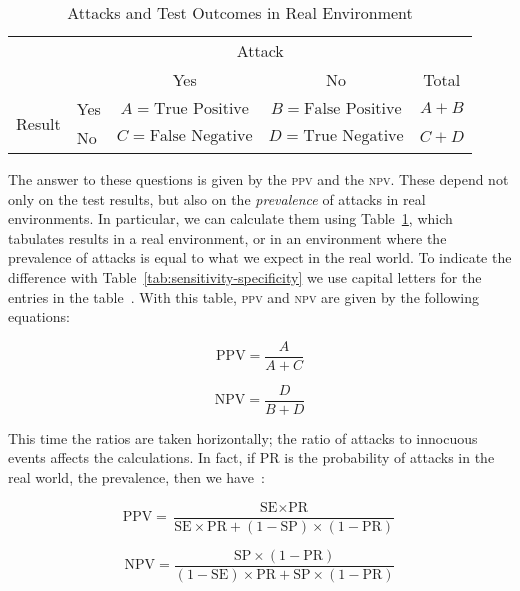 \documentclass[conference]{IEEEtran}
\begin{document}
\begin{table}[ht]

\caption{Attacks and Test Outcomes in Real Environment}
\label{tab:ppv-npv}

\begin{tabular}{l|l|c|c|c}
\multicolumn{2}{c}{} & \multicolumn{2}{c}{Attack} & \\ \cline{3-4}
\multicolumn{2}{c|}{} & Yes & No & Total \\ \cline{2-5}
\multirow{2}{*}{Result} &  Yes &  $A = \textrm{True Positive}$ & 
$B = \textrm{False Positive}$ & \multicolumn{1}{c|}{$A + B$}\\
& No & $C = \textrm{False Negative}$ & $D = \textrm{True Negative}$ &
\multicolumn{1}{c|}{$C + D$}\\ 
\cline{2-5}
\end{tabular}

\end{table}

The answer to these questions is given by the \textsc{ppv} and the
\textsc{npv}. These depend not only on the test results, but also on
the \emph{prevalence} of attacks in real environments. In particular,
we can calculate them using Table~\ref{tab:ppv-npv}, which tabulates
results in a real environment, or in an environment where the
prevalence of attacks is equal to what we expect in the real world. To
indicate the difference with Table~\ref{tab:sensitivity-specificity}
we use capital letters for the entries in the table~\cite{linn2004}.
With this table, \textsc{ppv} and \textsc{npv} are given by the
following equations:

\begin{equation}
\textrm{PPV} = \frac{A}{A + C}
\end{equation}

\begin{equation}
\textrm{NPV} = \frac{D}{B + D}
\end{equation}

This time the ratios are taken horizontally; the ratio of attacks to
innocuous events affects the calculations. In fact, if PR is the
probability of attacks in the real world, the prevalence, then we
have~\cite{linn2004,altman1994}:

\begin{equation}
\textrm{PPV} = \frac{\textrm{SE}\times \textrm{PR}}{
\textrm{SE}\times \textrm{PR} + (1 - \textrm{SP})\times (1 - \textrm{PR})}
\end{equation}

\begin{equation}
\textrm{NPV} = \frac{\textrm{SP}\times (1 - \textrm{PR})}{
(1 - \textrm{SE})\times \textrm{PR} + \textrm{SP}\times (1 - \textrm{PR})}
\end{equation}
\end{document}
